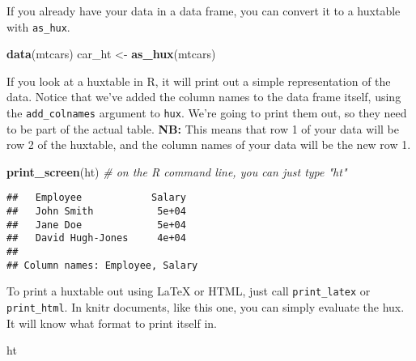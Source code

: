 \documentclass[]{article}
\newenvironment{Shaded}{\begin{snugshade}}{\end{snugshade}}
\newcommand{\KeywordTok}[1]{\textcolor[rgb]{0.13,0.29,0.53}{\textbf{#1}}}
\newcommand{\StringTok}[1]{\textcolor[rgb]{0.31,0.60,0.02}{#1}}
\newcommand{\CommentTok}[1]{\textcolor[rgb]{0.56,0.35,0.01}{\textit{#1}}}
\newcommand{\NormalTok}[1]{#1}
\begin{document}
\FloatBarrier

If you already have your data in a data frame, you can convert it to a
huxtable with \texttt{as\_hux}.

\begin{Shaded}
\begin{Highlighting}[]
\KeywordTok{data}\NormalTok{(mtcars)}
\NormalTok{car_ht <-}\StringTok{ }\KeywordTok{as_hux}\NormalTok{(mtcars)}
\end{Highlighting}
\end{Shaded}

\FloatBarrier

If you look at a huxtable in R, it will print out a simple
representation of the data. Notice that we've added the column names to
the data frame itself, using the \texttt{add\_colnames} argument to
\texttt{hux}. We're going to print them out, so they need to be part of
the actual table. \textbf{NB:} This means that row 1 of your data will
be row 2 of the huxtable, and the column names of your data will be the
new row 1.

\begin{Shaded}
\begin{Highlighting}[]
\KeywordTok{print_screen}\NormalTok{(ht)     }\CommentTok{# on the R command line, you can just type "ht"}
\end{Highlighting}
\end{Shaded}

\begin{verbatim}
##   Employee            Salary  
##   John Smith           5e+04  
##   Jane Doe             5e+04  
##   David Hugh-Jones     4e+04  
## 
## Column names: Employee, Salary
\end{verbatim}

\FloatBarrier

To print a huxtable out using LaTeX or HTML, just call
\texttt{print\_latex} or \texttt{print\_html}. In knitr documents, like
this one, you can simply evaluate the hux. It will know what format to
print itself in.

\begin{Shaded}
\begin{Highlighting}[]
\NormalTok{ht}
\end{Highlighting}
\end{Shaded}
\end{document}
